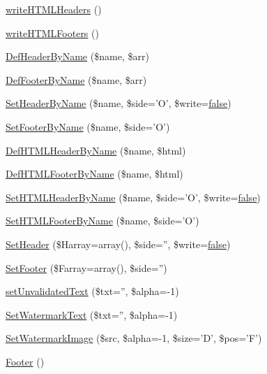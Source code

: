 \begin{DoxyCompactItemize}
\item 
\hyperlink{classm_p_d_f_afc2f4e83186b97637a08fbee17cc3425}{write\-H\-T\-M\-L\-Headers} ()
\item 
\hyperlink{classm_p_d_f_a1b73e53eed5a116e479e2bacde6c0c00}{write\-H\-T\-M\-L\-Footers} ()
\item 
\hyperlink{classm_p_d_f_a5d9438c9e35431c61955ec01104f0447}{Def\-Header\-By\-Name} (\$name, \$arr)
\item 
\hyperlink{classm_p_d_f_af7d01faaa8851da48fa14474eda6a56d}{Def\-Footer\-By\-Name} (\$name, \$arr)
\item 
\hyperlink{classm_p_d_f_a2b1f85e48f01bea1000ea53063546cbd}{Set\-Header\-By\-Name} (\$name, \$side='O', \$write=\hyperlink{ttfontsuni_8php_afbaa04e5cc97693dc668b3c45d3dd740}{false})
\item 
\hyperlink{classm_p_d_f_a02008928c66eca8771cb2dff2b5902e0}{Set\-Footer\-By\-Name} (\$name, \$side='O')
\item 
\hyperlink{classm_p_d_f_af1748a156c6c1dbc1904ac92d2191a8d}{Def\-H\-T\-M\-L\-Header\-By\-Name} (\$name, \$html)
\item 
\hyperlink{classm_p_d_f_a5043fd780d72aa55d7a73efc64bfdb30}{Def\-H\-T\-M\-L\-Footer\-By\-Name} (\$name, \$html)
\item 
\hyperlink{classm_p_d_f_a2cf965386688f554908eacdf70fdc811}{Set\-H\-T\-M\-L\-Header\-By\-Name} (\$name, \$side='O', \$write=\hyperlink{ttfontsuni_8php_afbaa04e5cc97693dc668b3c45d3dd740}{false})
\item 
\hyperlink{classm_p_d_f_a4cc639d35b662afc7497c137a6531591}{Set\-H\-T\-M\-L\-Footer\-By\-Name} (\$name, \$side='O')
\item 
\hyperlink{classm_p_d_f_a585756cad0d8b1dbcb9503cb49006d8f}{Set\-Header} (\$Harray=array(), \$side='', \$write=\hyperlink{ttfontsuni_8php_afbaa04e5cc97693dc668b3c45d3dd740}{false})
\item 
\hyperlink{classm_p_d_f_a71cbb9c31072bd7a6ffd94d6e9527b6f}{Set\-Footer} (\$Farray=array(), \$side='')
\item 
\hyperlink{classm_p_d_f_a4a475bb4feb244cce94d1f4aae5e68d9}{set\-Unvalidated\-Text} (\$txt='', \$alpha=-\/1)
\item 
\hyperlink{classm_p_d_f_af46d35b632bf400c07c8b91dd6c18f93}{Set\-Watermark\-Text} (\$txt='', \$alpha=-\/1)
\item 
\hyperlink{classm_p_d_f_aea0ba46111cb578508ed3c93bfd9b742}{Set\-Watermark\-Image} (\$src, \$alpha=-\/1, \$size='D', \$pos='F')
\item 
\hyperlink{classm_p_d_f_a3d6e9cc5fe22694b59d16357397f0823}{Footer} ()

\end{DoxyCompactItemize}
